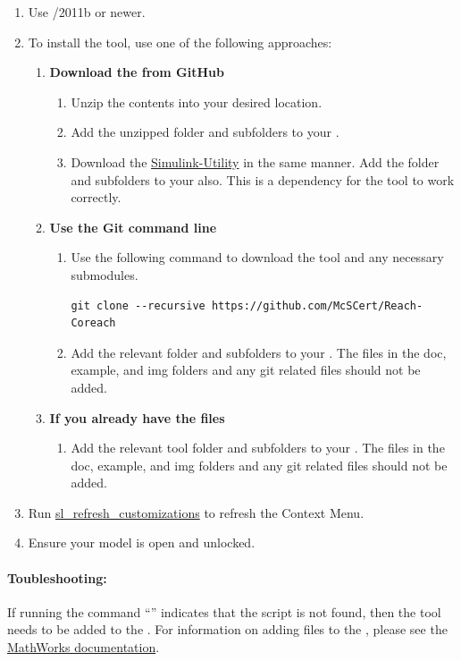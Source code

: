 \documentclass{article}
\begin{document}
\begin{enumerate}
	\item Use \Matlab/\Simulink 2011b or newer.
	\item To install the tool, use one of the following approaches:
		\begin{enumerate}
		\item \textbf{Download the  from GitHub}
		\begin{enumerate} 
			\item Unzip the contents into your desired location. 
			\item Add the unzipped folder and subfolders to your \mpath. 
			\item Download the \href{https://github.com/McSCert/Simulink-Utility}{Simulink-Utility} in the same manner. Add the folder and subfolders to your \mpath also. This is a dependency for the tool to work correctly.
		\end{enumerate}
		\item \textbf{Use the Git command line}
			\begin{enumerate}
				\item Use the following command to download the tool and any necessary submodules. 
				\hspace{-5em}\begin{verbatim}git clone --recursive https://github.com/McSCert/Reach-Coreach
				\end{verbatim}
				\item Add the relevant folder and subfolders to your \mpath. The files in the doc, example, and img folders and any git related files should not be added.
			\end{enumerate}
			\item \textbf{If you already have the files}
			\begin{enumerate}
						\item Add the relevant tool folder and subfolders to your \mpath. The files in the doc, example, and img folders and any git related files should not be added.
			\end{enumerate}
	\end{enumerate}
	\item Run \href{https://www.mathworks.com/help/simulink/ug/registering-customizations.html}{sl\_refresh\_customizations} to refresh the Context Menu. 
	\item Ensure your model is open and unlocked.
\end{enumerate}

\paragraph{Toubleshooting:} If running the command ``'' indicates that the script is not found, then the tool needs to be added to the \mpath. For information on adding files to the \mpath, please see the \href{https://www.mathworks.com/help/matlab/matlab_env/add-remove-or-reorder-folders-on-the-search-path.html}{MathWorks documentation}.
\end{document}

